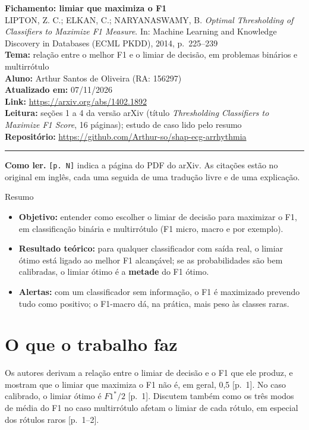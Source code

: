 \documentclass[11pt,a4paper]{article}
\begin{document}
\begin{center}
    {\LARGE \textbf{Fichamento: limiar que maximiza o F1}} \\[0.35em]
    {\large LIPTON, Z. C.; ELKAN, C.; NARYANASWAMY, B. \textit{Optimal Thresholding of Classifiers to Maximize F1 Measure}. In: Machine Learning and Knowledge Discovery in Databases (ECML PKDD), 2014, p.~225--239} \\[0.3em]
    \textbf{Tema:} relação entre o melhor F1 e o limiar de decisão, em problemas binários e multirrótulo \\[0.2em]
    \textbf{Aluno:} Arthur Santos de Oliveira (RA: 156297) \\[0.2em]
    \textbf{Atualizado em:} 07/11/2026 \\[0.2em]
    \textbf{Link:} \url{https://arxiv.org/abs/1402.1892} \\[0.2em]
    \textbf{Leitura:} seções 1 a 4 da versão arXiv (título \textit{Thresholding Classifiers to Maximize F1 Score}, 16 páginas); estudo de caso lido pelo resumo \\[0.2em]
    \textbf{Repositório:} \url{https://github.com/Arthur-so/shap-ecg-arrhythmia}
\end{center}
\vspace{-0.5em}
\hrule
\vspace{0.8em}

\textbf{Como ler.} \texttt{[p. N]} indica a página do PDF do arXiv. As citações estão no original em inglês, cada uma seguida de uma tradução livre e de uma explicação.

\begin{infobox}[note]{Resumo}
\begin{itemize}
\item \textbf{Objetivo:} entender como escolher o limiar de decisão para maximizar o F1, em classificação binária e multirrótulo (F1 micro, macro e por exemplo).
\item \textbf{Resultado teórico:} para qualquer classificador com saída real, o limiar ótimo está ligado ao melhor F1 alcançável; se as probabilidades são bem calibradas, o limiar ótimo é a \textbf{metade} do F1 ótimo.
\item \textbf{Alertas:} com um classificador sem informação, o F1 é maximizado prevendo tudo como positivo; o F1-macro dá, na prática, mais peso às classes raras.
\end{itemize}
\end{infobox}

\section{O que o trabalho faz}
Os autores derivam a relação entre o limiar de decisão e o F1 que ele produz, e mostram que o limiar que maximiza o F1 não é, em geral, 0,5 [p.~1]. No caso calibrado, o limiar ótimo é $F1^*/2$ [p.~1]. Discutem também como os três modos de média do F1 no caso multirrótulo afetam o limiar de cada rótulo, em especial dos rótulos raros [p.~1--2].
\end{document}

